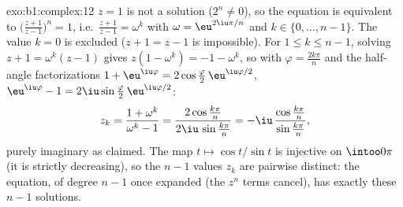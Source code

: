 \begin{solution}{exo:b1:complex:12}
$z = 1$ is not a solution ($2^n \neq 0$), so the equation is
equivalent to $\bigl(\frac{z+1}{z-1}\bigr)^n = 1$, i.e.\
$\frac{z+1}{z-1} = \omega^k$ with $\omega = \eu^{2\iu\pi/n}$ and
$k \in \{0, \dots, n-1\}$. The value $k = 0$ is excluded ($z + 1 =
z - 1$ is impossible). For $1 \leq k \leq n - 1$, solving
$z + 1 = \omega^k(z - 1)$ gives $z(1 - \omega^k) = -1 - \omega^k$,
so with $\varphi = \frac{2k\pi}{n}$ and the half-angle
factorizations $1 + \eu^{\iu\varphi} = 2\cos\frac\varphi2\,
\eu^{\iu\varphi/2}$, $\eu^{\iu\varphi} - 1 = 2\iu\sin\frac\varphi2
\,\eu^{\iu\varphi/2}$:
\[
z_k = \frac{1 + \omega^k}{\omega^k - 1}
= \frac{2\cos\frac{k\pi}{n}}{2\iu\,\sin\frac{k\pi}{n}}
= -\iu\,\frac{\cos\frac{k\pi}{n}}{\sin\frac{k\pi}{n}} ,
\]
purely imaginary as claimed. The map $t \mapsto \cos t/\sin t$ is
injective on $\intoo0\pi$ (it is strictly decreasing), so the
$n - 1$ values $z_k$ are pairwise distinct: the equation, of degree
$n - 1$ once expanded (the $z^n$ terms cancel), has exactly these
$n - 1$ solutions.
\end{solution}

